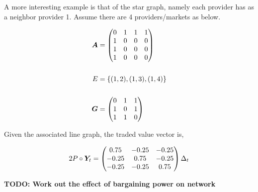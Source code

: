A more interesting example is that of the star graph, namely each provider has as a neighbor provider 1. Assume there are 4 providers/markets as below.

\vspace{5mm}
\begin{minipage}{.5\textwidth}
    \resizebox{\textwidth}{!}{}
\end{minipage}
\begin{minipage}{.5\textwidth}
    \begin{equation*}
        \begin{split}
            \matr{A} &= \begin{pmatrix}
                0 & 1 & 1 & 1 \\
                1 & 0 & 0 & 0 \\
                1 & 0 & 0 & 0 \\
                1 & 0 & 0 & 0
            \end{pmatrix} \\
            \vspace{5mm} \\
            E &= \set{(1, 2), (1, 3), (1, 4)} \\
            \vspace{5mm} \\
            \matr{G} &= \begin{pmatrix}
                0 & 1 & 1 \\
                1 & 0 & 1 \\
                1 & 1 & 0
            \end{pmatrix}
        \end{split}
    \end{equation*}
\end{minipage}
\vspace{5mm}

Given the associated line graph, the traded value vector is,

\begin{equation}
    2 P \circ \bm{Y}_t = \begin{pmatrix}
        0.75  & -0.25 & -0.25 \\
        -0.25 & 0.75  & -0.25 \\
        -0.25 & -0.25 & 0.75
    \end{pmatrix} \Delta_t
\end{equation}

\textbf{TODO: Work out the effect of bargaining power on network}
